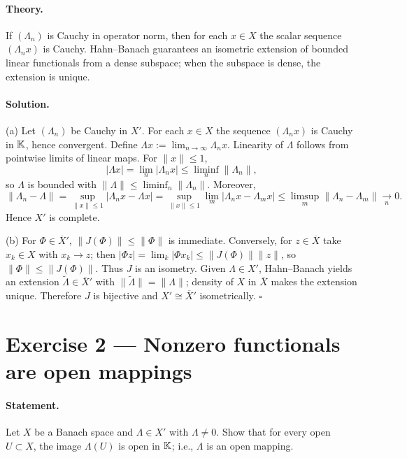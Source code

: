 \documentclass[12pt,a4paper]{article}
\newcommand{\qed}{\hfill$\square$}
\theoremstyle{plain}
\theoremstyle{definition}
\theoremstyle{remark}
\theoremstyle{remark}
\theoremstyle{definition}
\begin{document}
	\paragraph{Theory.}
	If $(\Lambda_n)$ is Cauchy in operator norm, then for each $x\in X$ the scalar sequence $(\Lambda_n x)$ is Cauchy.
	Hahn--Banach guarantees an isometric extension of bounded linear functionals from a dense subspace; when the subspace is dense, the extension is unique.
	
	\paragraph{Solution.}
	(a) Let $(\Lambda_n)$ be Cauchy in $X'$. For each $x\in X$ the sequence $(\Lambda_n x)$ is Cauchy in $\Bbb K$, hence convergent. Define $\Lambda x:=\lim_{n\to\infty}\Lambda_n x$. Linearity of $\Lambda$ follows from pointwise limits of linear maps. For $\|x\|\le 1$,
	\[
	|\Lambda x|=\lim_{n}|\Lambda_n x|\le \liminf_{n}\|\Lambda_n\|,
	\]
	so $\Lambda$ is bounded with $\|\Lambda\|\le \liminf_n \|\Lambda_n\|$. Moreover,
	\[
	\|\Lambda_n-\Lambda\|
	=\sup_{\|x\|\le 1} |\Lambda_n x-\Lambda x|
	=\sup_{\|x\|\le 1}\lim_{m} |\Lambda_n x-\Lambda_m x|
	\le \limsup_{m}\|\Lambda_n-\Lambda_m\|\xrightarrow[n]{}0.
	\]
	Hence $X'$ is complete.
	
	\smallskip
	(b) For $\Phi\in\overline{X}'$, $\|J(\Phi)\|\le \|\Phi\|$ is immediate. Conversely, for $z\in\overline{X}$ take $x_k\in X$ with $x_k\to z$; then
	$|\Phi z|=\lim_k |\Phi x_k| \le \|J(\Phi)\|\|z\|$, so $\|\Phi\|\le \|J(\Phi)\|$. Thus $J$ is an isometry.
	Given $\Lambda\in X'$, Hahn--Banach yields an extension $\widetilde\Lambda\in\overline{X}'$ with $\|\widetilde\Lambda\|=\|\Lambda\|$; density of $X$ in $\overline{X}$ makes the extension unique. Therefore $J$ is bijective and $X'\cong \overline{X}'$ isometrically.
	\qed
	
	\bigskip
	
	\section*{Exercise 2 — Nonzero functionals are open mappings}
	
	\paragraph{Statement.}
	Let $X$ be a Banach space and $\Lambda\in X'$ with $\Lambda\neq 0$.
	Show that for every open $U\subset X$, the image $\Lambda(U)$ is open in $\Bbb K$; i.e., $\Lambda$ is an open mapping.
	
\end{document}
